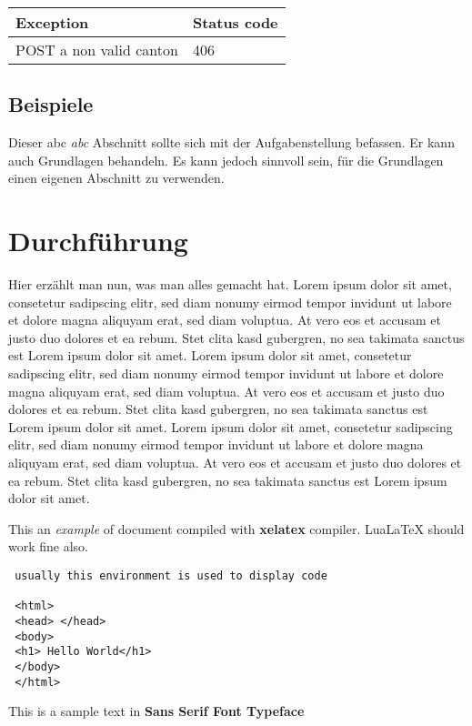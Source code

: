 \documentclass[12pt]{scrartcl}
\begin{document}
\begin{table}[ht]
\begin{tabular}{| l | l |}  
\hline
\textbf{Exception} & \textbf{Status code} \\
\hline  
POST a non valid canton & 406 \\ 
\hline 
\end{tabular}
\end{table}


\subsection{Beispiele}

Dieser abc {\itshape abc} Abschnitt sollte sich mit der Aufgabenstellung befassen. Er kann auch
Grundlagen behandeln. Es kann jedoch sinnvoll sein, für die Grundlagen einen
eigenen Abschnitt zu verwenden.
\section{Durchführung}
Hier erzählt man nun, was man alles gemacht hat.
Lorem ipsum dolor sit amet, consetetur sadipscing elitr, sed diam nonumy eirmod tempor invidunt ut labore et dolore magna aliquyam erat, sed diam voluptua. At vero eos et accusam et justo duo dolores et ea rebum. Stet clita kasd gubergren, no sea takimata sanctus est Lorem ipsum dolor sit amet. Lorem ipsum dolor sit amet, consetetur sadipscing elitr, sed diam nonumy eirmod tempor invidunt ut labore et dolore magna aliquyam erat, sed diam voluptua. At vero eos et accusam et justo duo dolores et ea rebum. Stet clita kasd gubergren, no sea takimata sanctus est Lorem ipsum dolor sit amet. Lorem ipsum dolor sit amet, consetetur sadipscing elitr, sed diam nonumy eirmod tempor invidunt ut labore et dolore magna aliquyam erat, sed diam voluptua. At vero eos et accusam et justo duo dolores et ea rebum. Stet clita kasd gubergren, no sea takimata sanctus est Lorem ipsum dolor sit amet.   


 This an \textit{example} of document compiled
 with \textbf{xelatex} compiler. LuaLaTeX should
 work fine also.

 \begin{verbatim}
 usually this environment is used to display code

 <html>
 <head> </head>
 <body>
 <h1> Hello World</h1>
 </body>
 </html>
 \end{verbatim}

 {\sffamily This is a sample text in \textbf{Sans Serif Font Typeface}}
\end{document}
